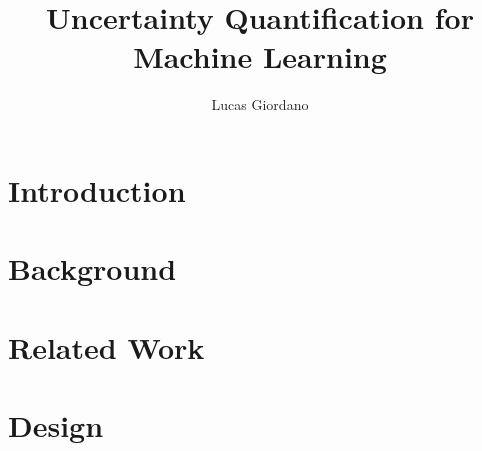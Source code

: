 \documentclass[a4paper,11pt,oneside]{report}
\title{Uncertainty Quantification for Machine Learning}
\author{Lucas Giordano}
\begin{document}
\maketitle
\makededication
\makeacks

\begin{abstract}





\end{abstract}


\begin{notations}

\end{notations}


\maketoc

\chapter{Introduction}


\chapter{Background}  \label{chatper:background}


\chapter{Related Work}  \label{chatper:related-work}



\chapter{Design} \label{chatper:design}
\end{document}
